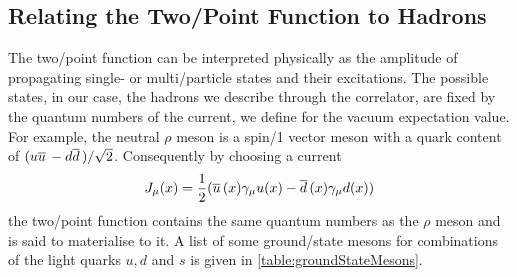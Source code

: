\documentclass[../../index.tex]{subfiles}
\begin{document}
\subsection{Relating the Two\-/Point Function to Hadrons}
The two\-/point function can be interpreted physically as the amplitude of
propagating single- or multi\-/particle states and their excitations. The
possible states, in our case, the hadrons we describe through the correlator,
are fixed by the quantum numbers of the current, we define for the vacuum
expectation value. For example, the neutral \(\rho\) meson is a spin\-/1 vector
meson with a quark content of \((u\overline{u}\, - d\overline{d}\,)/\sqrt{2}\). Consequently
by choosing a current
\begin{equation}
  J_\mu(x) = \frac{1}{2} ( \overline{u}\,(x)\gamma_\mu u(x) - \overline{d}\,(x)\gamma_\mu d(x) )
\end{equation}
the two\-/point function contains the same quantum numbers as the \(\rho\) meson
and is said to materialise to it. A list of some ground\-/state mesons for
combinations of the light quarks \(u, d\) and \(s\) is given in
\cref{table:groundStateMesons}.
\end{document}
